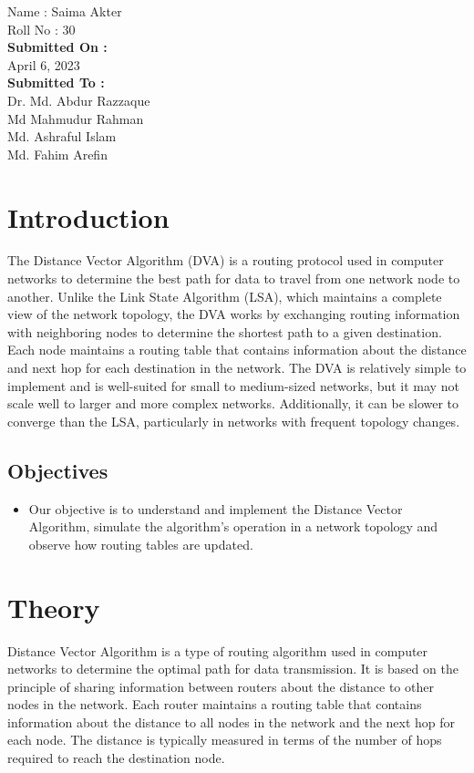 \documentclass[11pt]{article}
\begin{document}
\begin{titlepage}
\begin{large}
			Name : Saima Akter\\[8pt]
			Roll No : 30\\[12pt]
		\textbf{Submitted On : \\[12pt]}
			April 6, 2023\\[20pt]
		\textbf{Submitted To :\\[12pt]}
			Dr. Md. Abdur Razzaque\\[12pt]
                Md Mahmudur Rahman\\[12pt]
                Md. Ashraful Islam\\[12pt]
                Md. Fahim Arefin
	\end{large}
\end{titlepage}

\section{Introduction}
The Distance Vector Algorithm (DVA) is a routing protocol used in computer networks to determine the best path for data to travel from one network node to another. Unlike the Link State Algorithm (LSA), which maintains a complete view of the network topology, the DVA works by exchanging routing information with neighboring nodes to determine the shortest path to a given destination. Each node maintains a routing table that contains information about the distance and next hop for each destination in the network. The DVA is relatively simple to implement and is well-suited for small to medium-sized networks, but it may not scale well to larger and more complex networks. Additionally, it can be slower to converge than the LSA, particularly in networks with frequent topology changes.

\subsection{Objectives}
\begin{itemize}
    \item Our objective is to understand and implement the Distance Vector Algorithm, simulate the algorithm's operation in a network topology and observe how routing tables are updated.

\end{itemize}
\section{Theory}
Distance Vector Algorithm is a type of routing algorithm used in computer networks to determine the optimal path for data transmission. It is based on the principle of sharing information between routers about the distance to other nodes in the network. Each router maintains a routing table that contains information about the distance to all nodes in the network and the next hop for each node. The distance is typically measured in terms of the number of hops required to reach the destination node.
\end{document}
